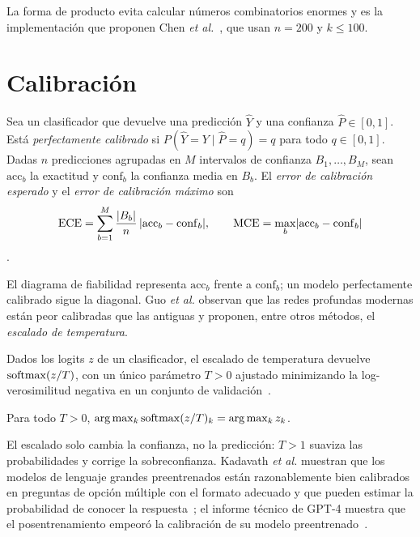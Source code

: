 La forma de producto evita calcular números combinatorios enormes y es la implementación que proponen Chen \emph{et al.}~\cite[§2.1, fig.~3]{chen}, que usan $n=200$ y $k\le 100$.

\addtocounter{definicion}{1}%

\section{Calibración}

\begin{definicion}\label{def:ece}
Sea un clasificador que devuelve una predicción $\hat Y$ y una confianza $\hat P\in[0,1]$. Está \emph{perfectamente calibrado} si $P(\hat Y=Y\mid\hat P=q)=q$ para todo $q\in[0,1]$. Dadas $n$ predicciones agrupadas en $M$ intervalos de confianza $B_1,\dots,B_M$, sean $\mathrm{acc}_b$ la exactitud y $\mathrm{conf}_b$ la confianza media en $B_b$. El \emph{error de calibración esperado} y el \emph{error de calibración máximo} son
\[
\operatorname{ECE}=\sum_{b=1}^{M}\frac{\lvert B_b\rvert}{n}\,\lvert\mathrm{acc}_b-\mathrm{conf}_b\rvert,\qquad \operatorname{MCE}=\max_b\lvert\mathrm{acc}_b-\mathrm{conf}_b\rvert
\]
\cite[§2, ecs.~(1), (3) y~(5)]{guo}.
\end{definicion}

\addtocounter{definicion}{1}%

El diagrama de fiabilidad representa $\mathrm{acc}_b$ frente a $\mathrm{conf}_b$; un modelo perfectamente calibrado sigue la diagonal. Guo \emph{et al.} observan que las redes profundas modernas están peor calibradas que las antiguas y proponen, entre otros métodos, el \emph{escalado de temperatura}.

\begin{definicion}\label{def:temp}
Dados los logits $z$ de un clasificador, el escalado de temperatura devuelve $\operatorname{softmax}(z/T)$, con un único parámetro $T>0$ ajustado minimizando la log-verosimilitud negativa en un conjunto de validación~\cite[§4]{guo}.
\end{definicion}

\begin{proposicion}\label{prop:temp}
Para todo $T>0$, $\arg\max_k\operatorname{softmax}(z/T)_k=\arg\max_kz_k$.
\end{proposicion}

El escalado solo cambia la confianza, no la predicción: $T>1$ suaviza las probabilidades y corrige la sobreconfianza. Kadavath \emph{et al.} muestran que los modelos de lenguaje grandes preentrenados están razonablemente bien calibrados en preguntas de opción múltiple con el formato adecuado y que pueden estimar la probabilidad de conocer la respuesta~\cite{kadavath}; el informe técnico de GPT-4 muestra que el posentrenamiento empeoró la calibración de su modelo preentrenado~\cite{gpt4}.

